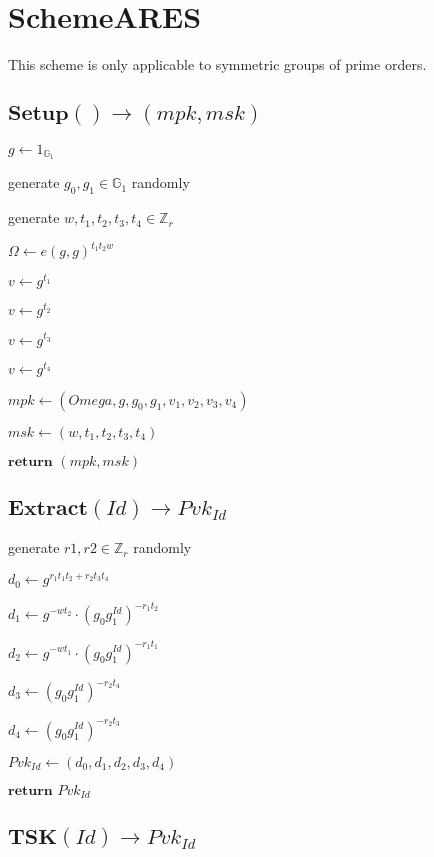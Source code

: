 \documentclass[a4paper]{article}
\begin{document}
\section{SchemeARES}

This scheme is only applicable to symmetric groups of prime orders. 

\subsection{$\textbf{Setup}() \rightarrow (\textit{mpk}, \textit{msk})$}

$g \gets 1_{\mathbb{G}_1}$

generate $g_0, g_1 \in \mathbb{G}_1$ randomly

generate $w, t_1, t_2, t_3, t_4 \in \mathbb{Z}_r$

$\Omega \gets e(g, g)^{t_1 t_2 w}$

$v \gets g^{t_1}$

$v \gets g^{t_2}$

$v \gets g^{t_3}$

$v \gets g^{t_4}$

$\textit{mpk} \gets (Omega, g, g_0, g_1, v_1, v_2, v_3, v_4)$

$\textit{msk} \gets (w, t_1, t_2, t_3, t_4)$

$\textbf{return }(\textit{mpk}, \textit{msk})$

\subsection{$\textbf{Extract}(\textit{Id}) \rightarrow \textit{Pvk}_\textit{Id}$}

generate $r1, r2 \in \mathbb{Z}_r$ randomly

$d_0 \gets g^{r_1 t_1 t_2 + r_2 t_3 t_4}$

$d_1 \gets g^{- w t_2} \cdot (g_0 g_1^\textit{Id})^{-  r_1 t_2}$

$d_2 \gets g^{- w t_1} \cdot (g_0 g_1^\textit{Id})^{-  r_1 t_1}$

$d_3 \gets (g_0 g_1^\textit{Id})^{-  r_2 t_4}$

$d_4 \gets (g_0 g_1^\textit{Id})^{-  r_2 t_3}$

$\textit{Pvk}_\textit{Id} \gets (d_0, d_1, d_2, d_3, d_4)$

$\textbf{return }\textit{Pvk}_\textit{Id}$

\subsection{$\textbf{TSK}(\textit{Id}) \rightarrow \textit{Pvk}_\textit{Id}$}
\end{document}
